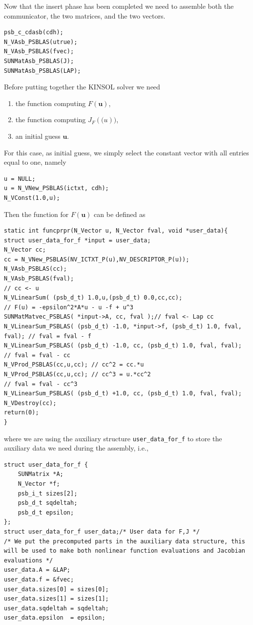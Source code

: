 \documentclass[twoside,a4paper]{refart}
\theoremstyle{definition}
\begin{document}
Now that the insert phase has been completed we need to assemble both the communicator, the two matrices, and the two vectors.
\begin{lstlisting}[style=CStyle]
psb_c_cdasb(cdh);
N_VAsb_PSBLAS(utrue);
N_VAsb_PSBLAS(fvec);
SUNMatAsb_PSBLAS(J);
SUNMatAsb_PSBLAS(LAP);
\end{lstlisting}
Before putting together the KINSOL solver we need
\begin{enumerate}
	\item the function computing $F(\mathbf{u})$,
	\item the function computing $J_F(\mathbf(u))$,
	\item an initial guess $\mathbf{u}$.
\end{enumerate}
For this case, as initial guess, we simply select the constant vector with all entries equal to one, namely
\begin{lstlisting}[style=CStyle]
u = NULL;
u = N_VNew_PSBLAS(ictxt, cdh);
N_VConst(1.0,u);
\end{lstlisting}
Then the function for $F(\mathbf{u})$ can be defined as
\begin{lstlisting}[style=CStyle]
static int funcprpr(N_Vector u, N_Vector fval, void *user_data){
struct user_data_for_f *input = user_data;
N_Vector cc;
cc = N_VNew_PSBLAS(NV_ICTXT_P(u),NV_DESCRIPTOR_P(u));
N_VAsb_PSBLAS(cc);
N_VAsb_PSBLAS(fval);
// cc <- u
N_VLinearSum( (psb_d_t) 1.0,u,(psb_d_t) 0.0,cc,cc);     
// F(u) = -epsilon^2*A*u - u -f + u^3
SUNMatMatvec_PSBLAS( *input->A, cc, fval );// fval <- Lap cc
N_VLinearSum_PSBLAS( (psb_d_t) -1.0, *input->f, (psb_d_t) 1.0, fval, fval); // fval = fval - f
N_VLinearSum_PSBLAS( (psb_d_t) -1.0, cc, (psb_d_t) 1.0, fval, fval); // fval = fval - cc     
N_VProd_PSBLAS(cc,u,cc); // cc^2 = cc.*u                      
N_VProd_PSBLAS(cc,u,cc); // cc^3 = u.*cc^2                    
// fval = fval - cc^3  
N_VLinearSum_PSBLAS( (psb_d_t) +1.0, cc, (psb_d_t) 1.0, fval, fval);        
N_VDestroy(cc);
return(0);
} 
\end{lstlisting}
where we are using the auxiliary structure \lstinline[style=CStyle]|user_data_for_f| to store the auxiliary data we need during the assembly, i.e.,
\begin{lstlisting}[style=CStyle]
struct user_data_for_f {
	SUNMatrix *A;
	N_Vector *f;
	psb_i_t sizes[2];
	psb_d_t sqdeltah;
	psb_d_t epsilon;
};
struct user_data_for_f user_data;/* User data for F,J */
/* We put the precomputed parts in the auxiliary data structure, this will be used to make both nonlinear function evaluations and Jacobian evaluations */
user_data.A = &LAP;
user_data.f = &fvec;
user_data.sizes[0] = sizes[0];
user_data.sizes[1] = sizes[1];
user_data.sqdeltah = sqdeltah;
user_data.epsilon  = epsilon;
\end{lstlisting}
\end{document}
